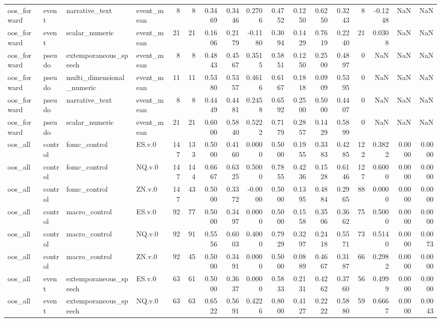 \begin{tabular}{llllrrrrrrrrrrrrr}
oos_forward & event & narrative_text & event_mean & 8 & 8 & 0.3469 & 0.3446 & 0.2706 & 0.4752 & 0.1250 & 0.6250 & 0.3243 & 8 & -0.1248 & NaN & NaN \\
oos_forward & event & scalar_numeric & event_mean & 21 & 21 & 0.1606 & 0.2179 & -0.1180 & 0.3094 & 0.1429 & 0.7619 & 0.2240 & 21 & 0.0308 & NaN & NaN \\
oos_forward & pseudo & extemporaneous_speech & event_mean & 8 & 8 & 0.4843 & 0.4567 & 0.3515 & 0.5851 & 0.1250 & 0.2500 & 0.4897 & 0 & NaN & NaN & NaN \\
oos_forward & pseudo & multi_dimensional_numeric & event_mean & 11 & 11 & 0.5380 & 0.5357 & 0.4616 & 0.6167 & 0.1818 & 0.0909 & 0.5395 & 0 & NaN & NaN & NaN \\
oos_forward & pseudo & narrative_text & event_mean & 8 & 8 & 0.4449 & 0.4481 & 0.2458 & 0.6592 & 0.2500 & 0.5000 & 0.4407 & 0 & NaN & NaN & NaN \\
oos_forward & pseudo & scalar_numeric & event_mean & 21 & 21 & 0.6000 & 0.5840 & 0.5222 & 0.7179 & 0.2857 & 0.1429 & 0.5899 & 0 & NaN & NaN & NaN \\
oos_all & control & fomc_control & ES.v.0 & 147 & 133 & 0.5000 & 0.4160 & 0.0000 & 0.5000 & 0.1955 & 0.3383 & 0.4285 & 122 & 0.3822 & 0.0000 & 0.0000 \\
oos_all & control & fomc_control & NQ.v.0 & 147 & 144 & 0.6667 & 0.6325 & 0.5000 & 0.7855 & 0.4236 & 0.1528 & 0.6146 & 127 & 0.6000 & 0.0000 & 0.0000 \\
oos_all & control & fomc_control & ZN.v.0 & 147 & 43 & 0.5000 & 0.3372 & -0.0000 & 0.5000 & 0.1395 & 0.4884 & 0.2965 & 88 & 0.0000 & 0.0000 & 0.0000 \\
oos_all & control & macro_control & ES.v.0 & 92 & 77 & 0.5000 & 0.3497 & 0.0000 & 0.5000 & 0.1558 & 0.3506 & 0.3662 & 75 & 0.5000 & 0.0000 & 0.0000 \\
oos_all & control & macro_control & NQ.v.0 & 92 & 91 & 0.5556 & 0.6003 & 0.4000 & 0.7929 & 0.3297 & 0.2418 & 0.5571 & 73 & 0.5140 & 0.0000 & 0.0073 \\
oos_all & control & macro_control & ZN.v.0 & 92 & 45 & 0.5000 & 0.3491 & 0.0000 & 0.5000 & 0.0889 & 0.4667 & 0.3187 & 66 & 0.2982 & 0.0000 & 0.0000 \\
oos_all & event & extemporaneous_speech & ES.v.0 & 63 & 61 & 0.5000 & 0.3637 & 0.0000 & 0.5833 & 0.2131 & 0.4262 & 0.3760 & 56 & 0.4999 & 0.0000 & 0.0000 \\
oos_all & event & extemporaneous_speech & NQ.v.0 & 63 & 63 & 0.6522 & 0.5691 & 0.4226 & 0.8000 & 0.4127 & 0.2222 & 0.5880 & 59 & 0.6667 & 0.0000 & 0.0043 \\

\end{tabular}
